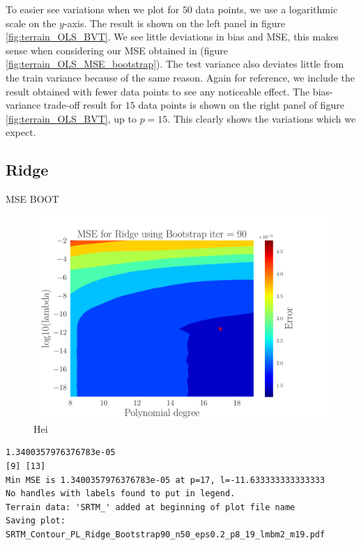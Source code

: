 \documentclass[reprint,english,notitlepage,aps,nobalancelastpage,nofootinbib]{revtex4-1}  %
\begin{document}
To easier see variations when we plot for $50$ data points, we use a logarithmic scale on the $y$-axis. The result is shown on the left panel in figure \ref{fig:terrain_OLS_BVT}. We see little deviations in bias and MSE, this makes sense when considering our MSE obtained in (figure \ref{fig:terrain_OLS_MSE_bootstrap}). The test variance also deviates little from the train variance because of the same reason. Again for reference, we include the result obtained with fewer data points to see any noticeable effect. The bias-variance trade-off result for $15$ data points is shown on the right panel of figure \ref{fig:terrain_OLS_BVT}, up to $p=15$. This clearly shows the variations which we expect.

\subsection*{Ridge}
MSE BOOT
\begin{figure}[h]
	\includegraphics[width=\linewidth]{SRTM_Contour_PL_Ridge_Bootstrap90_n50_eps0.2_p8_19_lmbm2_m19.pdf}
	\caption{Hei}
	\label{fig:terrain_Ridge_MSE_Boot}
\end{figure}
\begin{verbatim}
1.3400357976376783e-05
[9] [13]
Min MSE is 1.3400357976376783e-05 at p=17, l=-11.633333333333333
No handles with labels found to put in legend.
Terrain data: 'SRTM_' added at beginning of plot file name
Saving plot:  SRTM_Contour_PL_Ridge_Bootstrap90_n50_eps0.2_p8_19_lmbm2_m19.pdf
\end{verbatim}
\end{document}
